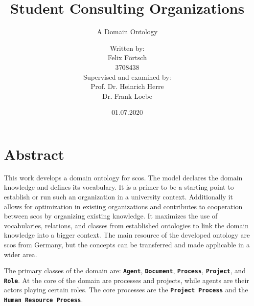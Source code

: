 \documentclass[a4paper, DIV=13, BCOR=0cm]{scrbook}
\newcommand{\class}[1]{\texttt{\textbf{#1}}}
\begin{document}
\titlehead{
	Overall Progress: 
}
\subject{Bachelor's Thesis}
\title{Student Consulting Organizations}
\subtitle{A Domain Ontology}
\author{Written by: \\ Felix Förtsch \\ 3708438 \vspace{1cm} \\
	Supervised and examined by: \\
	Prof. Dr. Heinrich Herre \\
	Dr. Frank Loebe \vspace{0.5cm}}
\date{01.07.2020}
\publishers{Leipzig University}
\maketitle

\frontmatter
\chapter*{Abstract}
	This work develops a domain ontology for \glspl{sco}. The model declares the domain knowledge and defines its vocabulary. It is a primer to be a starting point to establish or run such an organization in a university context. Additionally it allows for optimization in existing organizations and contributes to cooperation between \glspl{sco} by organizing existing knowledge. It maximizes the use of vocabularies, relations, and classes from established ontologies to link the domain knowledge into a bigger context. The main resource of the developed ontology are \glspl{sco} from Germany, but the concepts can be transferred and made applicable in a wider area.
	
	The primary classes of the domain are: \class{Agent}, \class{Document}, \class{Process}, \class{Project}, and \class{Role}. At the core of the domain are processes and projects, while agents are their actors playing certain roles. The core processes are the \class{Project Process} and the \class{Human Resource Process}.
	
\end{document}
